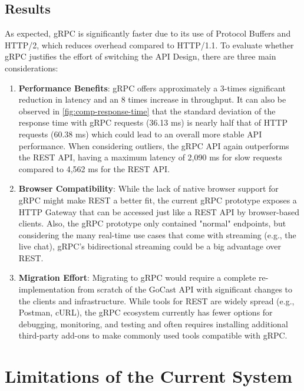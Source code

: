 \subsection{Results}

As expected, gRPC is significantly faster due to its use of Protocol Buffers and HTTP/2, which reduces overhead compared to HTTP/1.1. To evaluate whether gRPC justifies the effort of switching the \ac{API} Design, there are three main considerations:

\begin{enumerate}
    \item \textbf{Performance Benefits}: gRPC offers approximately a 3-times significant reduction in latency and an 8 times increase in throughput. It can also be observed in \autoref{fig:comp-response-time} that the standard deviation of the response time with gRPC requests (36.13 ms) is nearly half that of HTTP requests (60.38 ms) which could lead to an overall more stable \ac{API} performance.  When considering outliers, the gRPC \ac{API} again outperforms the REST \ac{API}, having a maximum latency of 2,090 ms for slow requests compared to 4,562 ms for the REST \ac{API}.

    \item \textbf{Browser Compatibility}: While the lack of native browser support for gRPC might make REST a better fit, the current gRPC prototype exposes a HTTP Gateway that can be accessed just like a REST \ac{API} by browser-based clients. Also, the gRPC prototype only contained "normal" endpoints, but considering the many real-time use cases that come with streaming (e.g., the live chat), gRPC’s bidirectional streaming could be a big advantage over REST.

    \item \textbf{Migration Effort}: Migrating to gRPC would require a complete re-implementation from scratch of the GoCast \ac{API} with significant changes to the clients and infrastructure. While tools for REST are widely spread (e.g., Postman, cURL), the gRPC ecosystem currently has fewer options for debugging, monitoring, and testing and often requires installing additional third-party add-ons to make commonly used tools compatible with gRPC.
\end{enumerate}

\section{Limitations of the Current System}

